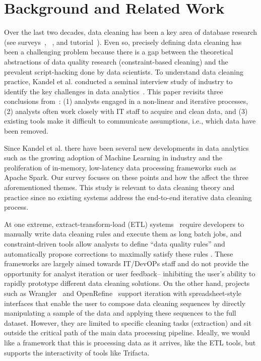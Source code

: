 \section{Background and Related Work}
Over the last two decades, data cleaning has been a key area of database research (see surveys~\cite{Dasu:2003:EDM:861869}, ~\cite{Rahm00datacleaning}, and tutorial~\cite{chu2016tut}).
Even so, precisely defining data cleaning has been a challenging problem because there is a gap between the theoretical abstractions of data quality research (constraint-based cleaning) and the prevalent script-hacking done by data scientists.
To understand data cleaning practice, Kandel et al. conducted a seminal interview study of industry to identify the key challenges in data analytics~\cite{kandel2012}. 
This paper revisits three conclusions from~\cite{kandel2012}: (1) analysts engaged in a non-linear and iterative processes, (2) analysts often work closely with IT staff to acquire and clean data, and (3) existing tools make it difficult to communicate assumptions, i.e., which data have been removed.

Since Kandel et al. there have been several new developments in data analytics such as the growing adoption of Machine Learning in industry and the proliferation of in-memory, low-latency data processing frameworks such as Apache Spark. 
Our survey focuses on these points and how the affect the three aforementioned themes.
This study is relevant to data cleaning theory and practice since no existing systems address the end-to-end iterative data cleaning process.

At one extreme, extract-transform-load (ETL) systems~\cite{informatica,talend,apachefalcon} require developers to manually write data cleaning rules and execute them as long batch jobs, 
and constraint-driven tools allow analysts to define ``data quality rules'' and automatically propose corrections to maximally satisfy these rules \cite{DBLP:conf/sigmod/DallachiesaEEEIOT13}.
These frameworks are largely aimed towards IT/DevOPs staff and do not provide the opportunity for analyst iteration or user feedback-- inhibiting the user's ability to rapidly prototype different data cleaning solutions.
On the other hand, projects such as Wrangler~\cite{wrangler,trifacta} and OpenRefine~\cite{openrefine} support iteration with spreadsheet-style interfaces that enable the user to compose data cleaning sequences by directly manipulating a sample of the data and applying these sequences to the full dataset.
However, they are limited to specific cleaning tasks (extraction) and sit outside the critical path of the main data processing pipeline. 
Ideally, we would like a framework that this is processing data as it arrives, like the ETL tools, but supports the interactivity of tools like Trifacta.

